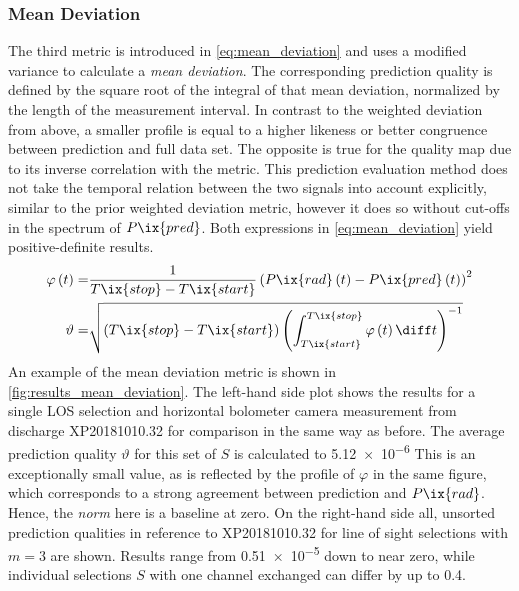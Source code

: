             \subsubsection*{Mean Deviation}%
%
                The third metric is introduced in \cref{eq:mean_deviation} and uses a modified variance to calculate a \textit{mean deviation}. The corresponding prediction quality is defined by the square root of the integral of that mean deviation, normalized by the length of the measurement interval. In contrast to the weighted deviation from above, a smaller profile is equal to a higher likeness or better congruence between prediction and full data set. The opposite is true for the quality map due to its inverse correlation with the metric. This prediction evaluation method does not take the temporal relation between the two signals into account explicitly, similar to the prior weighted deviation metric, however it does so without cut-offs in the spectrum of $P\ix{pred}$. Both expressions in \cref{eq:mean_deviation} yield positive-definite results.%
%
                \begin{align}%
                    \begin{split}\label{eq:mean_deviation}%
                        \varphi\left(t\right)=&\frac{1}{T\ix{stop}-T\ix{start}}\left(P\ix{rad}\left(t\right)-P\ix{pred}\left(t\right)\right)^{2}\\%
                        \vartheta=&\sqrt{\left(T\ix{stop}-T\ix{start}\right)\left(\int_{T\ix{start}}^{T\ix{stop}}\varphi\left(t\right)\diff t\right)^{-1}}%
                    \end{split}%
                \end{align}%
%
                An example of the mean deviation metric is shown in \cref{fig:results_mean_deviation}. The left-hand side plot shows the results for a single LOS selection and horizontal bolometer camera measurement from discharge XP20181010.32 for comparison in the same way as before. The average prediction quality $\vartheta$ for this set of $S$ is calculated to \SI{5.12e-6}{\arbitraryunit} This is an exceptionally small value, as is reflected by the profile of $\varphi$ in the same figure, which corresponds to a strong agreement between prediction and $P\ix{rad}$. Hence, the \textit{norm} here is a baseline at zero. On the right-hand side all, unsorted prediction qualities in reference to XP20181010.32 for line of sight selections with $m=3$ are shown. Results range from \SI{0.51e-5}{\arbitraryunit} down to near zero, while individual selections $S$ with one channel exchanged can differ by up to \SI{0.4}{\arbitraryunit}.\\%
